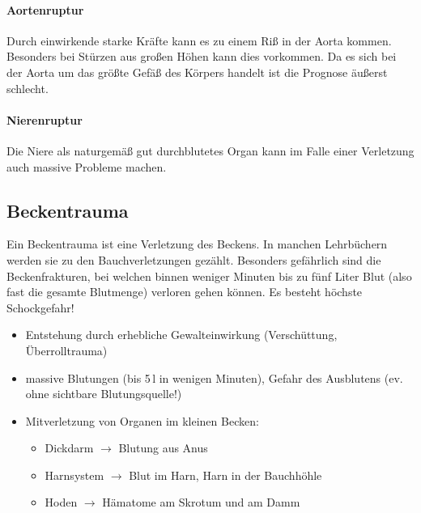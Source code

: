 \paragraph{Aortenruptur}\label{topic:aortenruptur}Durch
einwirkende starke Kräfte kann es zu einem Riß in der Aorta
kommen. Besonders bei Stürzen aus großen Höhen kann dies
vorkommen. Da es sich bei der Aorta um das größte Gefäß des
Körpers handelt ist die Prognose äußerst schlecht.

\paragraph{Nierenruptur}\label{topic:nierenruptur}
Die Niere als naturgemäß gut durchblutetes Organ kann im
Falle einer Verletzung auch massive Probleme machen.


\subsection{Beckentrauma}

Ein Beckentrauma ist eine Verletzung des Beckens. In manchen Lehrbüchern werden sie zu den Bauchverletzungen gezählt. Besonders gefährlich sind die Beckenfrakturen, bei welchen binnen weniger Minuten bis zu fünf Liter Blut (also fast die gesamte Blutmenge) verloren gehen können. Es besteht höchste Schockgefahr!
\begin{itemize}
    \item Entstehung durch erhebliche Gewalteinwirkung  (Versch\"uttung, \"Uberrolltrauma)
    \item massive  Blutungen (bis 5\,l in wenigen  Minuten),
    Gefahr des Ausblutens (ev. ohne sichtbare  Blutungsquelle!)
    \item Mitverletzung von Organen im kleinen  Becken:
    \begin{itemize}
        \item Dickdarm ${\rightarrow}$ Blutung aus Anus
        \item Harnsystem ${\rightarrow}$ Blut im Harn, Harn in der
        Bauchh\"ohle
        \item Hoden ${\rightarrow}$ H\"amatome am Skrotum und am  Damm
    \end{itemize}
\end{itemize}


